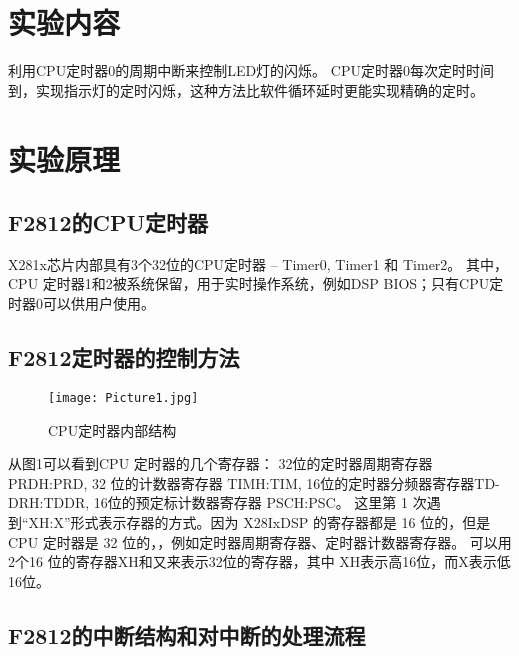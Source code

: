 \documentclass{math201}
\begin{document}

\makecover


\section{实验内容}

利用CPU定时器0的周期中断来控制LED灯的闪烁。
CPU定时器0每次定时时间到，实现指示灯的定时闪烁，这种方法比软件循环延时更能实现精确的定时。

\section{实验原理}

\subsection{F2812的CPU定时器}

X281x芯片内部具有3个32位的CPU定时器 -- Timer0, Timer1 和 Timer2。
其中，CPU 定时器1和2被系统保留，用于实时操作系统，例如DSP BIOS；只有CPU定时器0可以供用户使用。

\subsection{F2812定时器的控制方法}

\begin{figure}[H]  
    \centering\texttt{[image: Picture1.jpg]}  
    \caption{CPU定时器内部结构}     
    \label{img01}   
\end{figure}

从图1可以看到CPU 定时器的几个寄存器：
32位的定时器周期寄存器 PRDH:PRD,
32 位的计数器寄存器 TIMH:TIM,
16位的定时器分频器寄存器TD-DRH:TDDR,
16位的预定标计数器寄存器 PSCH:PSC。
这里第 1 次遇到“XH:X”形式表示存器的方式。因为 X28IxDSP 的寄存器都是 16 位的，但是 CPU 定时器是 32 位的，，例如定时器周期寄存器、定时器计数器寄存器。
可以用2个16 位的寄存器XH和又来表示32位的寄存器，其中 XH表示高16位，而X表示低16位。

\subsection{F2812的中断结构和对中断的处理流程}
\end{document}
